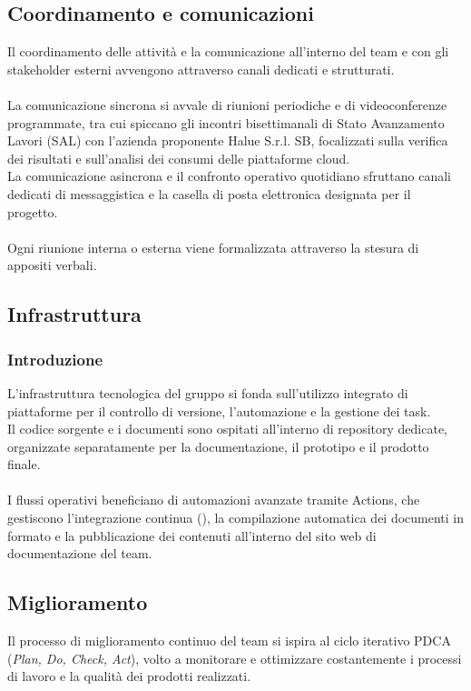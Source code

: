 \subsection{Coordinamento e comunicazioni}
Il coordinamento delle attività e la comunicazione all'interno del team e con gli stakeholder esterni avvengono attraverso canali dedicati e strutturati.\\
\\
La comunicazione sincrona si avvale di riunioni periodiche e di videoconferenze programmate, tra cui spiccano gli incontri bisettimanali di Stato Avanzamento Lavori (SAL) con l'azienda proponente Halue S.r.l. SB, focalizzati sulla verifica dei risultati e sull'analisi dei consumi delle piattaforme cloud. \\
La comunicazione asincrona e il confronto operativo quotidiano sfruttano canali dedicati di messaggistica e la casella di posta elettronica designata per il progetto. \\
\\
Ogni riunione interna o esterna viene formalizzata attraverso la stesura di appositi verbali.

\subsection{Infrastruttura}

\subsubsection{Introduzione}
L'infrastruttura tecnologica del gruppo si fonda sull'utilizzo integrato di piattaforme per il controllo di versione, l'automazione e la gestione dei task.\\
Il codice sorgente e i documenti sono ospitati all'interno di repository  dedicate, organizzate separatamente per la documentazione, il prototipo e il prodotto finale.\\
\\
I flussi operativi beneficiano di automazioni avanzate tramite  Actions, che gestiscono l'integrazione continua (), la compilazione automatica dei documenti in formato  e la pubblicazione dei contenuti all'interno del sito web di documentazione del team.


\subsection{Miglioramento}
Il processo di miglioramento continuo del team si ispira al ciclo iterativo PDCA (\emph{Plan, Do, Check, Act}), volto a monitorare e ottimizzare costantemente i processi di lavoro e la qualità dei prodotti realizzati.

